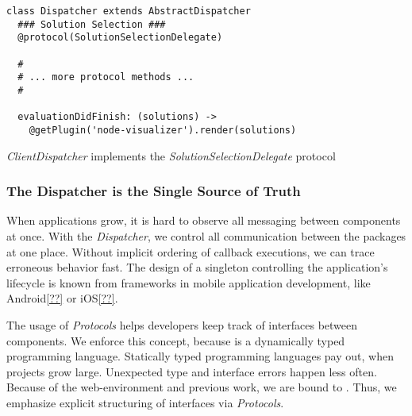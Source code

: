 \documentclass[../ClassicThesis.tex]{subfiles}
\begin{document}
\begin{listing}[!h]
\begin{verbatim}
class Dispatcher extends AbstractDispatcher
  ### Solution Selection ###
  @protocol(SolutionSelectionDelegate)

  #
  # ... more protocol methods ...
  #

  evaluationDidFinish: (solutions) ->
    @getPlugin('node-visualizer').render(solutions)
\end{verbatim}
\caption{\emph{ClientDispatcher} implements the \emph{SolutionSelectionDelegate}
  protocol}
\label{lst:client_dispatcher_protocol}
\end{listing}



\subsubsection{The Dispatcher is the Single Source of Truth}
\label{sec:disp-single-source}

When applications grow, it is hard to observe all messaging between components
at once. With the \emph{Dispatcher}, we control all communication between the
packages at one place. Without implicit ordering of callback executions, we can
trace erroneous behavior fast. The design of a singleton controlling the
application's lifecycle is known from frameworks in mobile application
development, like Android\ref{??} or iOS\ref{??}.

The usage of \emph{Protocols} helps developers keep track of interfaces between
components. We enforce this concept, because \javascript is a dynamically typed
programming language. Statically typed programming languages pay out, when
projects grow large. Unexpected type and interface errors happen less often.
Because of the web-environment and previous work, we are bound to \coffeescript.
Thus, we emphasize explicit structuring of interfaces via \emph{Protocols}.
\end{document}
